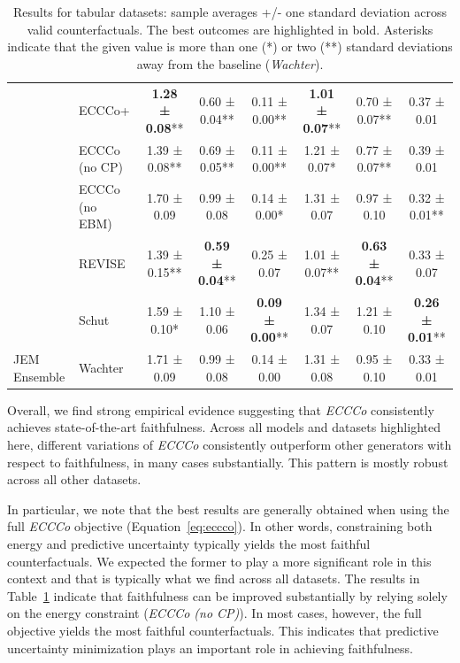 \documentclass[letterpaper]{article} %
\begin{document}
\begin{table}
{\begin{tabular}[t]{llcccccc}
    & ECCCo+ & \textbf{1.28 ± 0.08}** & 0.60 ± 0.04** & 0.11 ± 0.00** & \textbf{1.01 ± 0.07}** & 0.70 ± 0.07** & 0.37 ± 0.01\hphantom{*}\hphantom{*}\\

    & ECCCo (no CP) & 1.39 ± 0.08** & 0.69 ± 0.05** & 0.11 ± 0.00** & 1.21 ± 0.07*\hphantom{*} & 0.77 ± 0.07** & 0.39 ± 0.01\hphantom{*}\hphantom{*}\\

    & ECCCo (no EBM) & 1.70 ± 0.09\hphantom{*}\hphantom{*} & 0.99 ± 0.08\hphantom{*}\hphantom{*} & 0.14 ± 0.00*\hphantom{*} & 1.31 ± 0.07\hphantom{*}\hphantom{*} & 0.97 ± 0.10\hphantom{*}\hphantom{*} & 0.32 ± 0.01**\\

    & REVISE & 1.39 ± 0.15** & \textbf{0.59 ± 0.04}** & 0.25 ± 0.07\hphantom{*}\hphantom{*} & 1.01 ± 0.07** & \textbf{0.63 ± 0.04}** & 0.33 ± 0.07\hphantom{*}\hphantom{*}\\

    & Schut & 1.59 ± 0.10*\hphantom{*} & 1.10 ± 0.06\hphantom{*}\hphantom{*} & \textbf{0.09 ± 0.00}** & 1.34 ± 0.07\hphantom{*}\hphantom{*} & 1.21 ± 0.10\hphantom{*}\hphantom{*} & \textbf{0.26 ± 0.01}**\\

\multirow{-7}{*}{\raggedright\arraybackslash JEM Ensemble} & Wachter & 1.71 ± 0.09\hphantom{*}\hphantom{*} & 0.99 ± 0.08\hphantom{*}\hphantom{*} & 0.14 ± 0.00\hphantom{*}\hphantom{*} & 1.31 ± 0.08\hphantom{*}\hphantom{*} & 0.95 ± 0.10\hphantom{*}\hphantom{*} & 0.33 ± 0.01\hphantom{*}\hphantom{*}\\
\bottomrule
\end{tabular}}
\caption{Results for tabular datasets: sample averages +/- one standard deviation across valid counterfactuals. The best outcomes are highlighted in bold. Asterisks indicate that the given value is more than one (*) or two (**) standard deviations away from the baseline (\textit{Wachter}). \label{tab:results-tabular}}
\end{table}
    

Overall, we find strong empirical evidence suggesting that \textit{ECCCo} consistently achieves state-of-the-art faithfulness. Across all models and datasets highlighted here, different variations of \textit{ECCCo} consistently outperform other generators with respect to faithfulness, in many cases substantially. This pattern is mostly robust across all other datasets. 

In particular, we note that the best results are generally obtained when using the full \textit{ECCCo} objective (Equation~\ref{eq:eccco}). In other words, constraining both energy and predictive uncertainty typically yields the most faithful counterfactuals. We expected the former to play a more significant role in this context and that is typically what we find across all datasets. The results in Table~\ref{tab:results-tabular} indicate that faithfulness can be improved substantially by relying solely on the energy constraint (\textit{ECCCo (no CP)}). In most cases, however, the full objective yields the most faithful counterfactuals. This indicates that predictive uncertainty minimization plays an important role in achieving faithfulness. 
\end{document}
